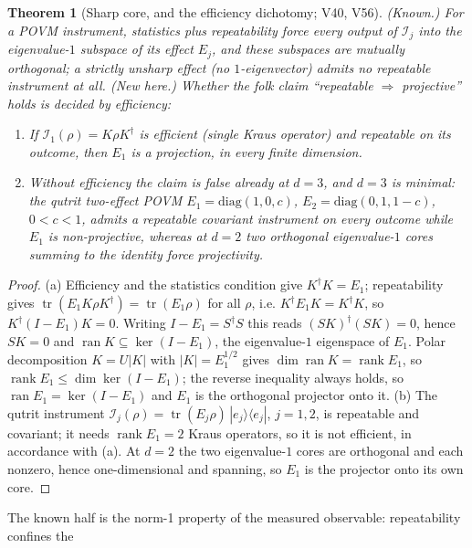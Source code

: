 \documentclass[11pt]{article}
\newtheorem{theorem}{Theorem}
\theoremstyle{definition}
\theoremstyle{remark}
\begin{document}
\begin{theorem}[Sharp core, and the efficiency dichotomy; V40, V56]\label{thm:sharp}
\emph{(Known.)} For a POVM instrument, statistics plus repeatability force every output of
$\mathcal I_j$ into the eigenvalue-$1$ subspace of its effect $E_j$, and these subspaces are
mutually orthogonal; a strictly unsharp effect (no $1$-eigenvector) admits no repeatable
instrument at all. \emph{(New here.)} Whether the folk claim ``repeatable $\Rightarrow$
projective'' holds is decided by \emph{efficiency}:
\begin{enumerate}[label=(\alph*),topsep=2pt,itemsep=1pt]
\item If $\mathcal I_1(\rho)=K\rho K^{\dagger}$ is efficient (single Kraus operator) and
repeatable on its outcome, then $E_1$ \emph{is} a projection, in every finite dimension.
\item Without efficiency the claim is false already at $d=3$, and $d=3$ is minimal: the qutrit
two-effect POVM $E_1=\mathrm{diag}(1,0,c)$, $E_2=\mathrm{diag}(0,1,1-c)$, $0<c<1$, admits a
repeatable covariant instrument on \emph{every} outcome while $E_1$ is non-projective, whereas at
$d=2$ two orthogonal eigenvalue-$1$ cores summing to the identity force projectivity.
\end{enumerate}
\end{theorem}
\begin{proof}
(a) Efficiency and the statistics condition give $K^{\dagger}K=E_1$; repeatability gives
$\operatorname{tr}(E_1K\rho K^{\dagger})=\operatorname{tr}(E_1\rho)$ for all $\rho$, i.e.
$K^{\dagger}E_1K=K^{\dagger}K$, so $K^{\dagger}(I-E_1)K=0$. Writing $I-E_1=S^{\dagger}S$ this
reads $(SK)^{\dagger}(SK)=0$, hence $SK=0$ and $\operatorname{ran}K\subseteq\ker(I-E_1)$, the
eigenvalue-$1$ eigenspace of $E_1$. Polar decomposition $K=U|K|$ with $|K|=E_1^{1/2}$ gives
$\dim\operatorname{ran}K=\operatorname{rank}E_1$, so $\operatorname{rank}E_1\le\dim\ker(I-E_1)$;
the reverse inequality always holds, so $\operatorname{ran}E_1=\ker(I-E_1)$ and $E_1$ is the
orthogonal projector onto it. (b) The qutrit instrument
$\mathcal I_j(\rho)=\operatorname{tr}(E_j\rho)\,|e_j\rangle\langle e_j|$, $j=1,2$, is repeatable
and covariant; it needs $\operatorname{rank}E_1=2$ Kraus operators, so it is not efficient, in
accordance with (a). At $d=2$ the two eigenvalue-$1$ cores are orthogonal and each nonzero,
hence one-dimensional and spanning, so $E_1$ is the projector onto its own core.
\end{proof}
The known half is the norm-1 property of the measured observable: repeatability confines the
\end{document}
